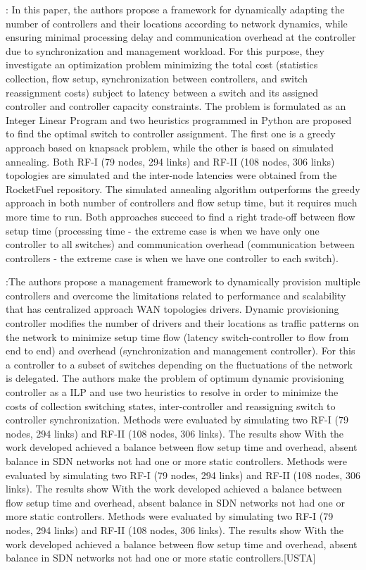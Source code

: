 \documentclass[a4paper,10pt]{article}
\begin{document}
\cite{BaRo13}: In this paper, the authors propose a framework for dynamically adapting the number of controllers and their locations according to network dynamics, while ensuring minimal processing delay and communication overhead at the controller due to synchronization and management workload. For this purpose, they investigate an optimization problem minimizing the total cost (statistics collection, flow setup, synchronization between controllers, and switch reassignment costs) subject to latency between a switch and its assigned controller and controller capacity constraints. The problem is formulated as an Integer Linear Program and two heuristics programmed in Python are proposed to find the optimal switch to controller assignment. The first one is a greedy approach based on knapsack problem, while the other is based on simulated annealing.  Both RF-I  (79 nodes, 294 links) and RF-II (108 nodes, 306 links) topologies are simulated and the inter-node latencies were obtained from the RocketFuel repository. The simulated annealing algorithm outperforms the greedy approach in both number of controllers and flow setup time, but it requires much more time to run. Both approaches succeed to find a right trade-off between flow setup time (processing time - the extreme case is when we have only one controller to all switches) and communication overhead (communication between controllers - the extreme case is when we have one controller to each switch). 

\cite{BaRo13}:The authors propose a management framework to dynamically provision multiple controllers and overcome the limitations related to performance and scalability that has centralized approach WAN topologies drivers. Dynamic provisioning controller modifies the number of drivers and their locations as traffic patterns on the network to minimize setup time flow (latency switch-controller to flow from end to end) and overhead (synchronization and management controller). For this a controller to a subset of switches depending on the fluctuations of the network is delegated. The authors make the problem of optimum dynamic provisioning controller as a ILP and use two heuristics to resolve in order to minimize the costs of collection switching states, inter-controller and reassigning switch to controller synchronization. Methods were evaluated by simulating two RF-I (79 nodes, 294 links) and RF-II (108 nodes, 306 links). The results show With the work developed achieved a balance between flow setup time and overhead, absent balance in SDN networks not had one or more static controllers. Methods were evaluated by simulating two RF-I (79 nodes, 294 links) and RF-II (108 nodes, 306 links). The results show With the work developed achieved a balance between flow setup time and overhead, absent balance in SDN networks not had one or more static controllers. Methods were evaluated by simulating two RF-I (79 nodes, 294 links) and RF-II (108 nodes, 306 links). The results show With the work developed achieved a balance between flow setup time and overhead, absent balance in SDN networks not had one or more static controllers.[USTA]
\end{document}
